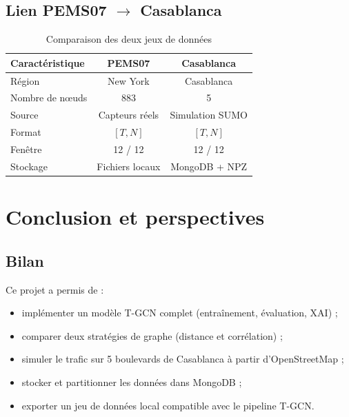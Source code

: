 \documentclass[12pt,a4paper]{report}
\begin{document}
\section{Lien PEMS07 $\rightarrow$ Casablanca}

\begin{table}[H]
  \centering
  \caption{Comparaison des deux jeux de données}
  \label{tab:compare}
  \begin{tabular}{lcc}
    \toprule
    Caractéristique  & PEMS07        & Casablanca \\
    \midrule
    Région           & New York      & Casablanca \\
    Nombre de nœuds  & 883           & 5 \\
    Source           & Capteurs réels & Simulation SUMO \\
    Format           & $[T, N]$      & $[T, N]$ \\
    Fenêtre          & 12 / 12       & 12 / 12 \\
    Stockage         & Fichiers locaux & MongoDB + NPZ \\
    \bottomrule
  \end{tabular}
\end{table}

\chapter{Conclusion et perspectives}
\label{ch:conclusion}

\section{Bilan}

Ce projet a permis de :
\begin{itemize}
  \item implémenter un modèle T-GCN complet (entraînement, évaluation, XAI) ;
  \item comparer deux stratégies de graphe (distance et corrélation) ;
  \item simuler le trafic sur 5 boulevards de Casablanca à partir d'OpenStreetMap ;
  \item stocker et partitionner les données dans MongoDB ;
  \item exporter un jeu de données local compatible avec le pipeline T-GCN.
\end{itemize}
\end{document}
